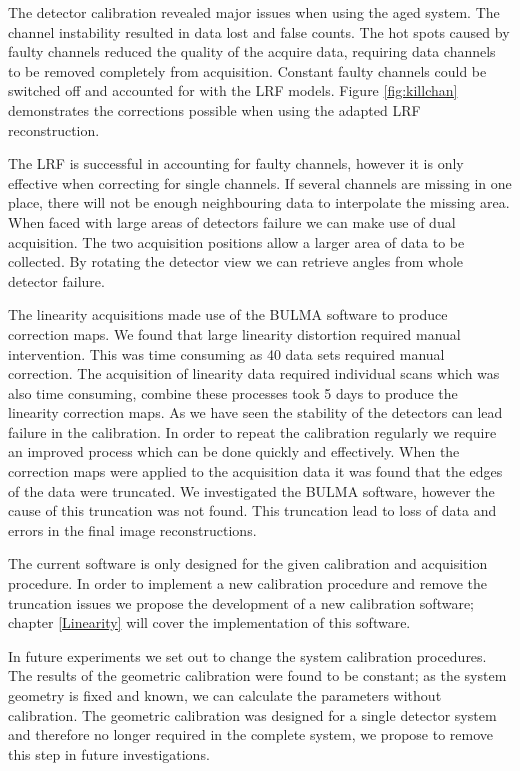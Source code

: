 The detector calibration revealed major issues when using the aged system. The channel instability resulted in data lost and false counts. The hot spots caused by faulty channels reduced the quality of the acquire data, requiring data channels to be removed completely from acquisition. Constant faulty channels could be switched off and accounted for with the \acrshort{LRF} models. Figure \ref{fig:killchan} demonstrates the corrections possible when using the adapted \acrshort{LRF} reconstruction. 

The \acrshort{LRF} is successful in accounting for faulty channels, however it is only effective when correcting for single channels. If several channels are missing in one place, there will not be enough neighbouring data to interpolate the missing area. When faced with large areas of detectors failure we can make use of dual acquisition. The two acquisition positions allow a larger area of data to be collected. By rotating the detector view we can retrieve angles from whole detector failure.

The linearity acquisitions made use of the BULMA software to produce correction maps. We found that large linearity distortion required manual intervention. This was time consuming as 40 data sets required manual correction. The acquisition of linearity data required individual scans which was also time consuming, combine these processes took 5 days to produce the linearity correction maps. As we have seen the stability of the detectors can lead failure in the calibration. In order to repeat the calibration regularly we require an improved process which can be done quickly and effectively. When the correction maps were applied to the acquisition data it was found that the edges of the data were truncated. We investigated the BULMA software, however the cause of this truncation was not found. This truncation lead to loss of data and errors in the final image reconstructions. 

The current software is only designed for the given calibration and acquisition procedure. In order to implement a new calibration procedure and remove the truncation issues we propose the development of a new calibration software; chapter \ref{Linearity} will cover the implementation of this software. 

In future experiments we set out to change the system calibration procedures. The results of the geometric calibration were found to be constant; as the system geometry is fixed and known, we can calculate the parameters without calibration. The geometric calibration was designed for a single detector system and therefore no longer required in the complete system, we propose to remove this step in future investigations.

